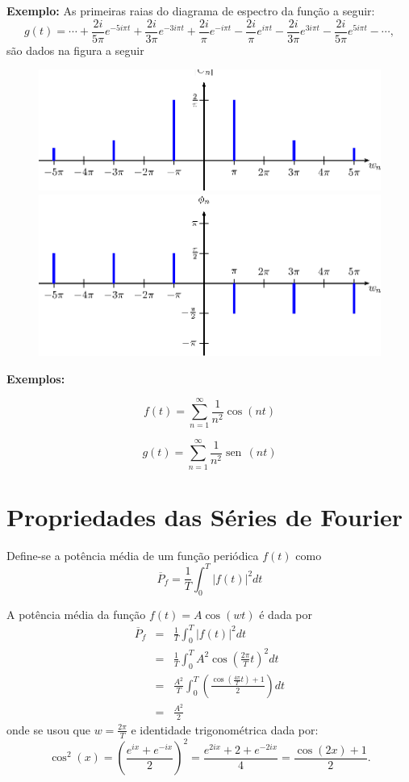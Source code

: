 \documentclass[a4paper,10pt]{book}
\renewcommand{\sin}{\operatorname{sen}\,}
\begin{document}
 
{\bf Exemplo:} As primeiras raias do diagrama de espectro da função a seguir: 
 \begin{equation}
 g(t)=\cdots+\frac{2i}{5\pi}e^{-5i\pi t}+\frac{2i}{3\pi}e^{-3i\pi t}+\frac{2i}{\pi}e^{-i\pi t}-\frac{2i}{\pi}e^{i\pi t}-\frac{2i}{3\pi}e^{3i\pi t}-\frac{2i}{5\pi}e^{5i\pi t}-\cdots,
 \end{equation}
 são dados na figura a seguir
 \begin{figure}[!ht] 
 \includegraphics{figs/cap_diagramas_espectro_figura_4}
 \includegraphics{figs/cap_diagramas_espectro_figura_5}
 \end{figure}


 {\bf Exemplos:}
 
 $$f(t)=\sum_{n=1}^\infty \frac{1}{n^2}\cos(nt)$$
 
 $$g(t)=\sum_{n=1}^\infty \frac{1}{n^2}\sin(nt)$$
 
 
 \section{Propriedades das Séries de Fourier}
 
Define-se a potência média de um função periódica $f(t)$ como
\begin{equation}\overline{P}_f=\frac{1}{T}\int_0^T |f(t)|^2dt
\end{equation}

 A potência média da função $f(t)=A\cos(wt)$ é dada por
 \begin{eqnarray*}
 \overline{P}_f&=&\frac{1}{T}\int_0^T |f(t)|^2dt\\
 &=&\frac{1}{T}\int_0^{T} A^2\cos\left(\frac{2\pi}{T} t\right)^2dt\\
 &=&\frac{A^2}{T}\int_0^{T} \left(\frac{\cos\left(\frac{4\pi}{T} t\right)+1}{2}  \right)dt\\
 &=&\frac{A^2}{2}
 \end{eqnarray*}
  onde se usou que $w=\frac{2\pi}{T}$ e identidade trigonométrica dada por:
 \begin{equation}\cos^2(x)=\left(\frac{e^{ix}+e^{-ix}}{2}\right)^2=\frac{e^{2ix}+2+e^{-2ix}}{4}=\frac{\cos(2x)+1}{2}.\end{equation}
\end{document}
